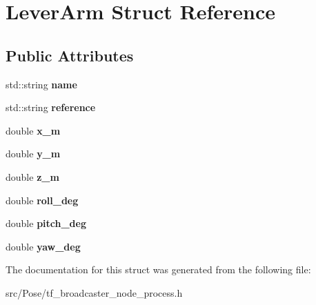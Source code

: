 \hypertarget{structLeverArm}{}\section{Lever\+Arm Struct Reference}
\label{structLeverArm}
\subsection*{Public Attributes}
\begin{DoxyCompactItemize}
\item 
\mbox{\label{structLeverArm_aa54390b4b13ffd3332ceebe078821078}} 
std\+::string {\bfseries name}
\item 
\mbox{\label{structLeverArm_ac12148329fc0a257ecb13d476c9a666f}} 
std\+::string {\bfseries reference}
\item 
\mbox{\label{structLeverArm_ac9e53fa999ac3bafd5f863c388e79e56}} 
double {\bfseries x\+\_\+m}
\item 
\mbox{\label{structLeverArm_a507548da4c7b1a25a50ee481899ed791}} 
double {\bfseries y\+\_\+m}
\item 
\mbox{\label{structLeverArm_a7089b34ab8276f1735139879366d085d}} 
double {\bfseries z\+\_\+m}
\item 
\mbox{\label{structLeverArm_a0ebe045d061f93cc8dc499dd902b89e5}} 
double {\bfseries roll\+\_\+deg}
\item 
\mbox{\label{structLeverArm_a12a7c8b532500a55cde8a25b7352f9a8}} 
double {\bfseries pitch\+\_\+deg}
\item 
\mbox{\label{structLeverArm_a653e84f3d176fb8d4d43a53f22ba68aa}} 
double {\bfseries yaw\+\_\+deg}
\end{DoxyCompactItemize}


The documentation for this struct was generated from the following file\+:\begin{DoxyCompactItemize}
\item 
src/\+Pose/tf\+\_\+broadcaster\+\_\+node\+\_\+process.\+h\end{DoxyCompactItemize}
